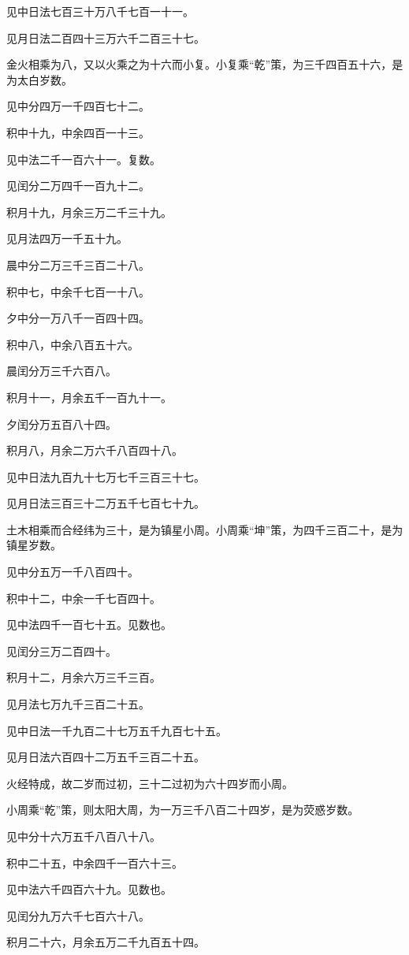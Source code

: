 \documentclass[]{article}
\begin{document}
见中日法七百三十万八千七百一十一。

见月日法二百四十三万六千二百三十七。

金火相乘为八，又以火乘之为十六而小复。小复乘``乾''策，为三千四百五十六，是为太白岁数。

见中分四万一千四百七十二。

积中十九，中余四百一十三。

见中法二千一百六十一。复数。

见闰分二万四千一百九十二。

积月十九，月余三万二千三十九。

见月法四万一千五十九。

晨中分二万三千三百二十八。

积中七，中余千七百一十八。

夕中分一万八千一百四十四。

积中八，中余八百五十六。

晨闰分万三千六百八。

积月十一，月余五千一百九十一。

夕闰分万五百八十四。

积月八，月余二万六千八百四十八。

见中日法九百九十七万七千三百三十七。

见月日法三百三十二万五千七百七十九。

土木相乘而合经纬为三十，是为镇星小周。小周乘``坤''策，为四千三百二十，是为镇星岁数。

见中分五万一千八百四十。

积中十二，中余一千七百四十。

见中法四千一百七十五。见数也。

见闰分三万二百四十。

积月十二，月余六万三千三百。

见月法七万九千三百二十五。

见中日法一千九百二十七万五千九百七十五。

见月日法六百四十二万五千三百二十五。

火经特成，故二岁而过初，三十二过初为六十四岁而小周。

小周乘``乾''策，则太阳大周，为一万三千八百二十四岁，是为荧惑岁数。

见中分十六万五千八百八十八。

积中二十五，中余四千一百六十三。

见中法六千四百六十九。见数也。

见闰分九万六千七百六十八。

积月二十六，月余五万二千九百五十四。
\end{document}
